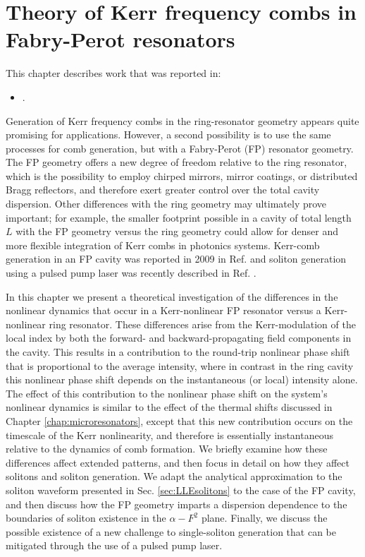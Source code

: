  \chapter{Theory of Kerr frequency combs in Fabry-Perot resonators} \label{chap:FPLLE}
 
 \begin{footnotesize}
 \begin{spacing}{1.2}
 	This chapter describes work that was reported in:
 	\begin{itemize}
 		\item {}.\\
 	\end{itemize}
 \end{spacing}
\end{footnotesize}

Generation of Kerr frequency combs in the ring-resonator geometry appears quite promising for applications. However, a second possibility is to use the same processes for comb generation, but with a Fabry-Perot (FP) resonator geometry. The FP geometry offers a new degree of freedom relative to the ring resonator, which is the possibility to employ chirped mirrors, mirror coatings, or distributed Bragg reflectors, and therefore exert greater control over the total cavity dispersion. Other differences with the ring geometry may ultimately prove important; for example, the smaller footprint possible in a cavity of total length $L$ with the FP geometry versus the ring geometry could allow for denser and more flexible integration of Kerr combs in photonics systems. Kerr-comb generation in an FP cavity was reported in 2009 in Ref.  and soliton generation using a pulsed pump laser was recently described in Ref. .

In this chapter we present a theoretical investigation of the differences in the nonlinear dynamics that occur in a Kerr-nonlinear FP resonator versus a Kerr-nonlinear ring resonator. These differences arise from the Kerr-modulation of the local index by both the forward- and backward-propagating field components in the cavity. This results in a contribution to the round-trip nonlinear phase shift that is proportional to the average intensity, where in contrast in the ring cavity this nonlinear phase shift depends on the instantaneous (or local) intensity alone. The effect of this contribution to the nonlinear phase shift on the system's nonlinear dynamics is similar to the effect of the thermal shifts discussed in Chapter \ref{chap:microresonators}, except that this new contribution occurs on the timescale of the Kerr nonlinearity, and therefore is essentially instantaneous relative to the dynamics of comb formation. We briefly examine how these differences affect extended patterns, and then focus in detail on how they affect solitons and soliton generation. We adapt the analytical approximation to the soliton waveform presented in Sec. \ref{sec:LLEsolitons} to the case of the FP cavity, and then discuss how the FP geometry imparts a dispersion dependence to the boundaries of soliton existence in the $\alpha-F^2$ plane. Finally, we discuss the possible existence of a new challenge to single-soliton generation that can be mitigated through the use of a pulsed pump laser.

